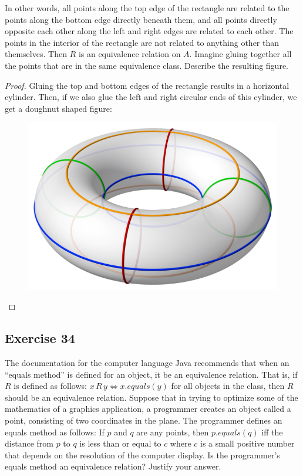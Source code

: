 \documentclass[14pt]{extarticle}
\begin{document}
In other words, all points along the top edge of the rectangle are related to the points along the bottom edge  
directly beneath them, and all points directly opposite each other along the left and right edges are related to  
each other. The points in the interior of the rectangle are not related to anything other than themselves. Then $R$ is 
an equivalence relation on $A$. Imagine gluing together all the points that are in the same equivalence class. Describe 
the resulting figure.

\begin{proof}
Gluing the top and bottom edges of the rectangle results in a horizontal cylinder. Then, if we also glue the left and
right circular ends of this cylinder, we get a doughnut shaped figure:

\begin{figure}[ht!]
\centering
\includegraphics[scale=0.2]{../images/8.3.33.png}
\end{figure}
\end{proof}

\subsection{Exercise 34}
The documentation for the computer language Java recommends that when an “equals method” is defined for an object, it 
be an equivalence relation. That is, if $R$ is defined as follows: \(x \,R\, y \iff x.equals(y)\) for all objects in 
the class, then $R$ should be an equivalence relation. Suppose that in trying to optimize some of the mathematics 
of a graphics application, a programmer creates an object called a point, consisting of two coordinates in the plane. 
The programmer defines an equals method as follows: If $p$ and $q$ are any points, then \(p.equals(q)\) iff the 
distance from $p$ to $q$ is less than or equal to $c$ where $c$ is a small positive number that depends on the 
resolution of the computer display. Is the programmer’s equals method an equivalence relation? Justify your answer.
\end{document}
